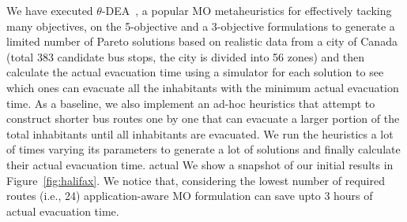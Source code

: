 We have executed $\theta$-DEA~\cite{yuan2015new}, a popular MO metaheuristics for effectively tacking many objectives, on the 5-objective and a 3-objective formulations to generate a limited number of Pareto solutions based on realistic data from a city of Canada (total 383 candidate bus stops, the city is divided into 56 zones) and then calculate the actual evacuation time using a simulator for each solution to see which ones can evacuate all the inhabitants with the minimum actual evacuation time. As a baseline, we also implement an ad-hoc heuristics that attempt to construct shorter bus routes one by one that can evacuate a larger portion of the total inhabitants until all inhabitants are evacuated. We run the heuristics a lot of times varying its parameters to generate a lot of solutions and finally calculate their actual evacuation time. actual We show a snapshot of our initial results in Figure~\ref{fig:halifax}. We notice that,  considering the lowest number of required routes (i.e., 24) application-aware MO formulation can save upto 3 hours of actual evacuation time.

